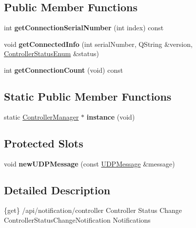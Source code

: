 \subsection*{Public Member Functions}
\begin{DoxyCompactItemize}
\item 
\mbox{\label{class_controller_manager_a1cc2f2da0ea22cc2a19138c0cb91ada5}} 
int {\bfseries get\+Connection\+Serial\+Number} (int index) const
\item 
\mbox{\label{class_controller_manager_a4e076c28025a9601dd7617672567b0a7}} 
void {\bfseries get\+Connected\+Info} (int serial\+Number, Q\+String \&version, \hyperlink{_global_defs_8h_a51207b6a49e0da6f9978a3019d93480a}{Controller\+Status\+Enum} \&status)
\item 
\mbox{\label{class_controller_manager_ae195bc494eb3d3afeabc4e71471497d3}} 
int {\bfseries get\+Connection\+Count} (void) const
\end{DoxyCompactItemize}
\subsection*{Static Public Member Functions}
\begin{DoxyCompactItemize}
\item 
\mbox{\label{class_controller_manager_a3f4999812436ab587f8ec2ee11128c51}} 
static \hyperlink{class_controller_manager}{Controller\+Manager} $\ast$ {\bfseries instance} (void)
\end{DoxyCompactItemize}
\subsection*{Protected Slots}
\begin{DoxyCompactItemize}
\item 
\mbox{\label{class_controller_manager_a5e9480ad4b88ff536ab60dbc9cb6619f}} 
void {\bfseries new\+U\+D\+P\+Message} (const \hyperlink{class_u_d_p_message}{U\+D\+P\+Message} \&message)
\end{DoxyCompactItemize}


\subsection{Detailed Description}
\{get\} /api/notification/controller Controller Status Change  Controller\+Status\+Change\+Notification  Notifications

